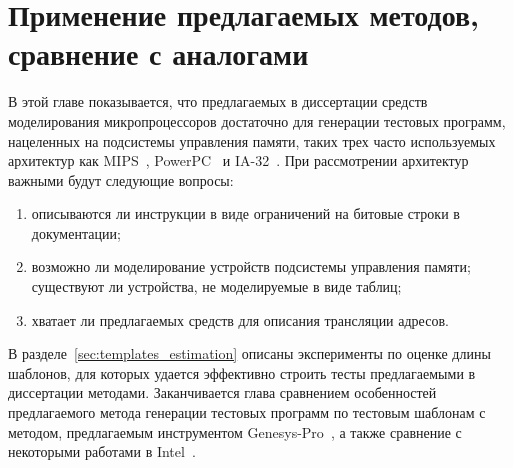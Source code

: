 \chapter{Применение предлагаемых методов, сравнение с аналогами}

В этой главе показывается, что предлагаемых в диссертации средств моделирования микропроцессоров достаточно для генерации тестовых программ, нацеленных на подсистемы управления памяти, таких трех часто используемых архитектур как MIPS~\cite{mips64II}, PowerPC~\cite{PowerPC} и IA-32~\cite{IA32}. При рассмотрении архитектур важными будут следующие вопросы:
\begin{enumerate}
    \item описываются ли инструкции в виде ограничений на битовые строки в документации;
    \item возможно ли моделирование устройств подсистемы управления памяти; существуют ли устройства, не моделируемые в виде таблиц;
    \item хватает ли предлагаемых средств для описания трансляции адресов.
\end{enumerate}

В разделе~\ref{sec:templates_estimation} описаны эксперименты по оценке длины шаблонов, для
которых удается эффективно строить тесты предлагаемыми в диссертации
методами. Заканчивается глава
сравнением особенностей предлагаемого метода генерации тестовых программ по
тестовым шаблонам с методом, предлагаемым инструментом
Genesys-Pro~\cite{GenesysPro}, а также сравнение с некоторыми работами в Intel~\cite{MicroFORMAL}.




